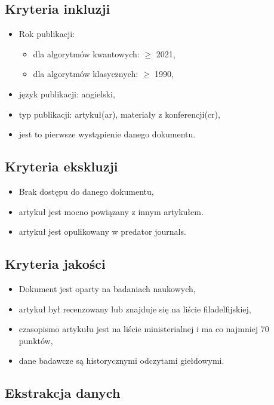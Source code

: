 \documentclass[polish,envcountsect,10pt]{article}
\begin{document}
\subsection{Kryteria inkluzji}
\begin{itemize}
	\item Rok publikacji: 
	\begin{itemize}
		\item dla algorytmów kwantowych: $\ge$ 2021,
		\item dla algorytmów klasycznych: $\ge$ 1990,
	\end{itemize}
	\item język publikacji: angielski,
	\item typ publikacji: artykuł(ar), materiały z konferencji(cr),
	\item jest to pierwsze wystąpienie danego dokumentu.
\end{itemize}

\subsection{Kryteria ekskluzji}

\begin{itemize}
	\item Brak dostępu do danego dokumentu,
	\item artykuł jest mocno powiązany z innym artykułem.
	\item artykuł jest opulikowany w predator journals.
\end{itemize}

\subsection{Kryteria jakości}

\begin{itemize}
	\item Dokument jest oparty na badaniach naukowych,
	\item artykuł był recenzowany lub znajduje się na liście filadelfijskiej,
	\item czasopismo artykułu jest na liście ministerialnej i ma co najmniej 70 punktów,
	\item dane badawcze są historycznymi odczytami giełdowymi.
\end{itemize}

\subsection{Ekstrakcja danych}
\end{document}
